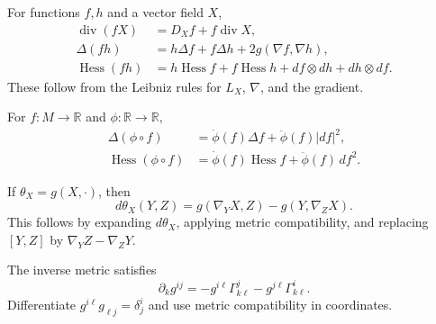 \begin{remark}
  \label{rem:pet-ch2-ex-5}


  For functions $f,h$ and a vector field $X$,
  \[
  \begin{aligned}
    \operatorname{div}(fX)
      &=D_Xf+f\operatorname{div}X,\\
    \Delta(fh)
      &=h\Delta f+f\Delta h+2g(\nabla f,\nabla h),\\
    \operatorname{Hess}(fh)
      &=h\operatorname{Hess}f+f\operatorname{Hess}h
        +df\otimes dh+dh\otimes df.
  \end{aligned}
  \]
  \sketch
  These follow from the Leibniz rules for $L_X$, $\nabla$, and the gradient.
\end{remark}

\begin{remark}
  \label{rem:pet-ch2-ex-6}


  For $f:M\to\mathbb{R}$ and
  $\phi:\mathbb{R}\to\mathbb{R}$,
  \[
  \begin{aligned}
    \Delta(\phi\circ f)
      &=\dot\phi(f)\Delta f+\ddot\phi(f)|df|^2,\\
    \operatorname{Hess}(\phi\circ f)
      &=\dot\phi(f)\operatorname{Hess}f+\ddot\phi(f)\,df^2.
  \end{aligned}
  \]
\end{remark}

\begin{remark}
  \label{rem:pet-ch2-ex-7}


  If $\theta_X=g(X,\cdot)$, then
  \[
    d\theta_X(Y,Z)
      =g(\nabla_YX,Z)-g(Y,\nabla_ZX).
  \]
  \sketch
  This follows by expanding $d\theta_X$, applying metric compatibility, and
  replacing $[Y,Z]$ by $\nabla_YZ-\nabla_ZY$.
\end{remark}

\begin{remark}
  \label{rem:pet-ch2-ex-8}


  The inverse metric satisfies
  \[
    \partial_kg^{ij}
      =-g^{i\ell}\Gamma^j_{k\ell}
       -g^{j\ell}\Gamma^i_{k\ell}.
  \]
  \sketch
  Differentiate $g^{i\ell}g_{\ell j}=\delta^i_j$ and use metric
  compatibility in coordinates.
\end{remark}

